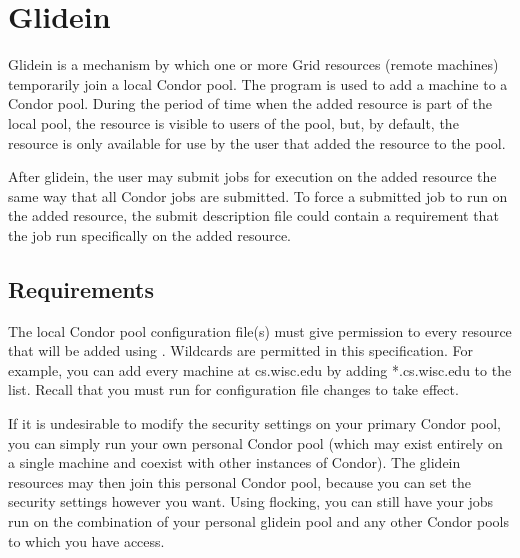 \section{\label{sec:Glidein}Glidein}

Glidein is a mechanism by which one or more Grid resources (remote machines)
temporarily join a local Condor pool. 
The program  is used to add a machine
to a Condor pool.
During the period of time when the added resource is
part of the local pool, the resource is visible 
to users of the pool, but, by default, the resource is only available for
use by the user
that added the resource to the pool.

After glidein, the user may submit jobs for execution on the
added resource the same way that all Condor jobs are submitted.
To force a submitted job to run on the added resource, the
submit description file could contain a requirement that the job run 
specifically on the added resource.


\subsection{ Requirements}

The local Condor pool configuration file(s) must 
give  permission
to every resource that will be added using . 
Wildcards are permitted in this specification.
For example, you can add every machine at
cs.wisc.edu by adding *.cs.wisc.edu to the
 list.
Recall that you must run  for configuration
file changes to take effect.

If it is undesirable to modify the security settings on
your primary Condor pool, you can simply run your own
personal Condor pool (which may exist entirely on a single
machine and coexist with other instances of Condor).  The glidein
resources may then join this personal Condor pool, because
you can set the security settings however you want.  Using
flocking, you can still have your jobs run on the combination
of your personal glidein pool and any other Condor pools to
which you have access.

